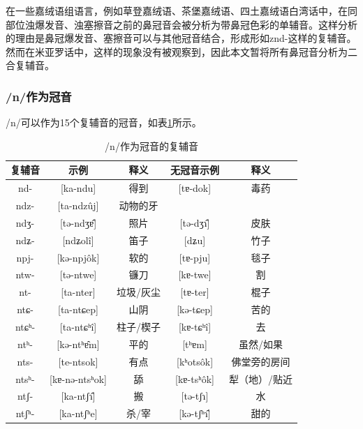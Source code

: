 在一些嘉绒语组语言，例如草登嘉绒语\cite{sun1994caodeng}、茶堡嘉绒语\cite{jacques2021grammar}、四土嘉绒语白湾话\cite{zhang2016phonologie}中，在同部位浊爆发音、浊塞擦音之前的鼻冠音会被分析为带鼻冠色彩的单辅音。这样分析的理由是鼻冠爆发音、塞擦音可以与其他冠音结合，形成形如znd-这样的复辅音。然而在米亚罗话中，这样的现象没有被观察到，因此本文暂将所有鼻冠音分析为二合复辅音。

\subsubsection{/n/作为冠音}

/n/可以作为15个复辅音的冠音，如表\ref{npre}所示。

\begin{table}[H]
\vspace{5pt}
    \centering
    \caption{/n/作为冠音的复辅音}
    \label{npre}
\begin{tabular}{c|cccc}
     \toprule
复辅音   & 示例              & 释义   & 无冠音示例          & 释义        \\
     \midrule
	nd-   & {[}ka-ndu{]}       & 得到    & {[}tɐ-dok{]}    & 毒药      \\
ndz-  & {[}ta-ndzûj{]}    & 动物的牙  &                 &         \\
ndʒ-  & {[}tə-ndʒɐ̂{]}     & 照片    & {[}tə-dʒɿ̂{]}   & 皮肤      \\
ndʑ-  & {[}ndʑolî{]}         & 笛子    &     {[}dʑu{]}         & 竹子  \\
npj-  & {[}kə-npjôk{]}    & 软的    & {[}tɐ-pju{]}    & 毯子      \\
ntw-  & {[}tə-ntwe{]}      & 镰刀    & {[}kɐ-twe{]}    & 割       \\
nt-   & {[}ta-nter{]}      & 垃圾/灰尘 & {[}tɐ-ter{]}    & 棍子      \\
ntɕ-  & {[}ta-ntɕep{]}     & 山阴    & {[}kə-tɕep{]}   & 苦的      \\
ntɕʰ- & {[}ta-ntɕʰî{]}    & 柱子/楔子 & {[}kɐ-tɕʰî{]}  & 去       \\
ntʰ-  & {[}kə-ntʰɐ̂m{]}    & 平的    & {[}tʰɐm{]}      & 虽然/如果   \\
nts-  & {[}te-ntsok{]}     & 有点    & {[}kʰotsôk{]}  & 佛堂旁的房间  \\
ntsʰ- & {[}kɐ-nə-ntsʰok{]} & 舔     & {[}kɐ-tsʰôk{]} & 犁（地）/贴近 \\
ntʃ-  & {[}ka-ntʃɿ̂{]}     & 搬     & {[}tə-tʃɿ{]}    & 水       \\
ntʃʰ- & {[}ka-ntʃʰe{]}     & 杀/宰   & {[}kə-tʃʰɿ̂{]}  & 甜的     \\ 
   \bottomrule
\end{tabular}
\end{table}

